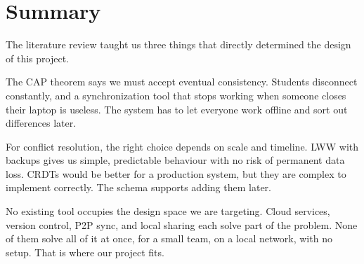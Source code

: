 \section{Summary}

The literature review taught us three things that directly determined the design of this project.

The CAP theorem says we must accept eventual consistency. Students disconnect constantly, and a synchronization tool that stops working when someone closes their laptop is useless. The system has to let everyone work offline and sort out differences later.

For conflict resolution, the right choice depends on scale and timeline. LWW with backups gives us simple, predictable behaviour with no risk of permanent data loss. CRDTs would be better for a production system, but they are complex to implement correctly. The schema supports adding them later.

No existing tool occupies the design space we are targeting. Cloud services, version control, P2P sync, and local sharing each solve part of the problem. None of them solve all of it at once, for a small team, on a local network, with no setup. That is where our project fits.
